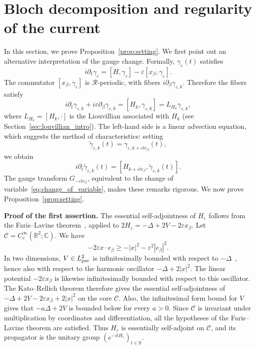 \documentclass[a4paper,11pt]{article}
\theoremstyle{plain}
\theoremstyle{remark}
\def\R{{\mathbb R}}
\def\C{{\mathbb C}}
\def\eps{{\varepsilon}}
\def\cR{{\mathcal R}}
\begin{document}
\section{Bloch decomposition and regularity of the current}\label{sec:preliminaries}
In this section, we prove Proposition~\ref{prop:setting}. We first
point out an alternative interpretation of the gauge change.
Formally, $\gamma_\eps(t)$ satisfies
\[
i\partial_t\gamma_\eps=[H,\gamma_\eps]-\eps[x_\beta,\gamma_\eps].
\]
The commutator $[x_\beta,\gamma_\eps]$ is $\cR$-periodic, with fibers
$i\partial_\beta\gamma_{\eps,k}$. Therefore the fibers satisfy
\[
i\partial_t\gamma_{\eps,k}+i\eps\partial_\beta\gamma_{\eps,k}
=[H_k,\gamma_{\eps,k}]=L_{H_k}\gamma_{\eps,k},
\]
where $L_{H_k}=[H_k,\cdot]$ is the Liouvillian associated with $H_k$
(see Section~\ref{sec:louvillian_intro}). The left-hand side is a linear
advection equation, which suggests the method of characteristics: setting
\begin{equation}\label{eq:change_of_variable}
\widetilde\gamma_{\eps,k}(t)=\gamma_{\eps,k+\eps te_\beta}(t),
\end{equation}
we obtain
\[
i\partial_t\widetilde\gamma_{\eps,k}(t)
=[H_{k+\eps te_\beta},\widetilde\gamma_{\eps,k}(t)].
\]
The gauge transform $G_{-\eps te_\beta}$, equivalent to the change of
variable~\eqref{eq:change_of_variable}, makes these remarks rigorous.
We now prove Proposition~\ref{prop:setting}.


{\bf Proof of the first assertion.}
The essential self-adjointness of $H_\eps$ follows from the
Faris--Lavine theorem~\cite[Theorem~X.38]{ReedSimon2}, applied to
$2H_\eps=-\Delta+2V-2\eps x_\beta$. Let
$\mathcal C=C_c^\infty(\R^2;\C)$. We have
\[
-2\eps x\cdot e_\beta\ge-|x|^2-\eps^2|e_\beta|^2.
\]
In two dimensions, $V\in L^2_{\rm per}$ is infinitesimally bounded with
respect to $-\Delta$~\cite[Theorem~XIII.96]{ReedSimon4}, hence also with
respect to the harmonic oscillator $-\Delta+2|x|^2$.
The linear potential $-2\eps x_\beta$ is likewise
infinitesimally bounded with respect to this oscillator. The Kato--Rellich
theorem therefore gives the essential self-adjointness of
$-\Delta+2V-2\eps x_\beta+2|x|^2$ on the core $\mathcal C$.
Also, the infinitesimal form bound for $V$ gives that $-a\Delta+2V$
is bounded below for every $a>0$. Since $\mathcal C$ is invariant
under multiplication by coordinates and differentiation, all the
hypotheses of the Faris--Lavine theorem are satisfied.
Thus $H_\eps$ is essentially self-adjoint on $\mathcal C$, and its
propagator is the unitary group
$(e^{-itH_\eps})_{t\in\R}$.
\end{document}
